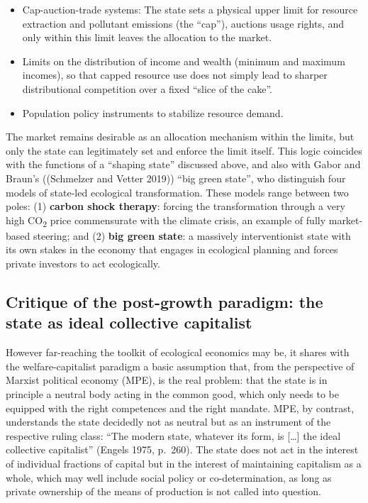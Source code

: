 \documentclass[
  british,
  a4paper,
  DIV=11,
  numbers=noendperiod,
  oneside,
  openany]{scrreprt}
\begin{document}
\begin{itemize}
\item
  Cap-auction-trade systems: The state sets a physical upper limit for
  resource extraction and pollutant emissions (the ``cap''), auctions
  usage rights, and only within this limit leaves the allocation to the
  market.
\item
  Limits on the distribution of income and wealth (minimum and maximum
  incomes), so that capped resource use does not simply lead to sharper
  distributional competition over a fixed ``slice of the cake''.
\item
  Population policy instruments to stabilize resource demand.
\end{itemize}

The market remains desirable as an allocation mechanism within the
limits, but only the state can legitimately set and enforce the limit
itself. This logic coincides with the functions of a ``shaping state''
discussed above, and also with Gabor and Braun's ((Schmelzer and Vetter
2019)) ``big green state'', who distinguish four models of state-led
ecological transformation. These models range between two poles: (1)
\textbf{carbon shock therapy}: forcing the transformation through a very
high CO\textsubscript{2} price commensurate with the climate crisis, an
example of fully market-based steering; and (2) \textbf{big green
state}: a massively interventionist state with its own stakes in the
economy that engages in ecological planning and forces private investors
to act ecologically.

\subsection{Critique of the post-growth paradigm: the state as ideal
collective
capitalist}\label{critique-of-the-post-growth-paradigm-the-state-as-ideal-collective-capitalist}

However far-reaching the toolkit of ecological economics may be, it
shares with the welfare-capitalist paradigm a basic assumption that,
from the perspective of Marxist political economy (MPE), is the real
problem: that the state is in principle a neutral body acting in the
common good, which only needs to be equipped with the right competences
and the right mandate. MPE, by contrast, understands the state decidedly
not as neutral but as an instrument of the respective ruling class:
``The modern state, whatever its form, is {[}\ldots{]} the ideal
collective capitalist'' (Engels 1975, p.~260). The state does not act in
the interest of individual fractions of capital but in the interest of
maintaining capitalism as a whole, which may well include social policy
or co-determination, as long as private ownership of the means of
production is not called into question.
\end{document}
